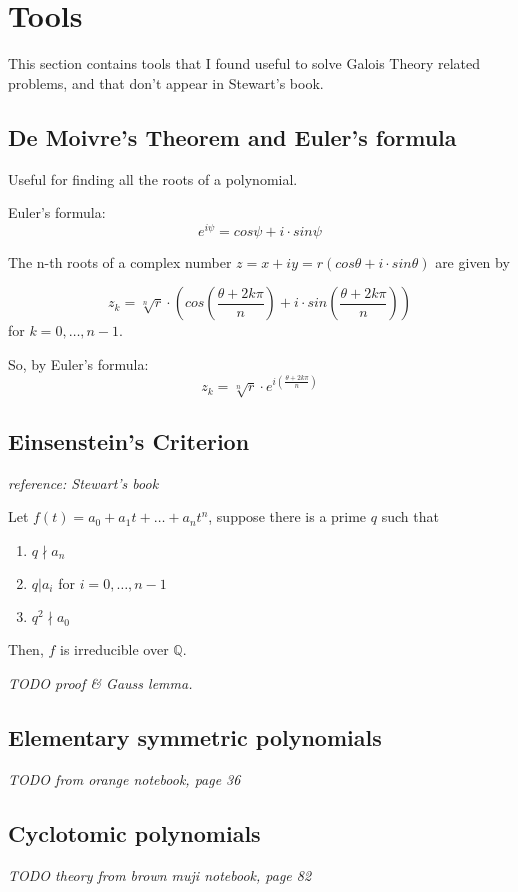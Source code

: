 \documentclass{article}
\theoremstyle{definition}
\begin{document}
\newpage

\section{Tools}
This section contains tools that I found useful to solve Galois Theory related problems, and that don't appear in Stewart's book.

\subsection{De Moivre's Theorem and Euler's formula}\label{demoivre}
Useful for finding all the roots of a polynomial.

Euler's formula:
$$e^{i \psi} = cos \psi + i \cdot sin \psi$$

The n-th roots of a complex number $z=x + i y = r (cos \theta + i \cdot sin \theta)$ are given by

$$z_k = \sqrt[n]{r} \cdot \left(cos(\frac{\theta + 2k \pi}{n}) + i \cdot sin(\frac{\theta + 2k \pi}{n}) \right)$$
for $k=0, \ldots, n-1$.

So, by Euler's formula:
$$z_k = \sqrt[n]{r} \cdot e^{i (\frac{\theta + 2 k \pi}{n})}$$

\subsection{Einsenstein's Criterion} \label{einsenstein}
\emph{reference: Stewart's book}

Let $f(t) = a_0 + a_1 t + \ldots + a_n t^n$, suppose there is a prime $q$ such that
\begin{enumerate}
  \item $q \nmid a_n$
  \item $q | a_i$ for $i=0, \ldots, n-1$
  \item $q^2 \nmid a_0$
\end{enumerate}
Then, $f$ is irreducible over $\mathbb{Q}$.

\emph{TODO proof \& Gauss lemma.}


\subsection{Elementary symmetric polynomials}
\emph{TODO from orange notebook, page 36}

\subsection{Cyclotomic polynomials} \label{cyclotomicpoly}
\emph{TODO theory from brown muji notebook, page 82}
\end{document}
